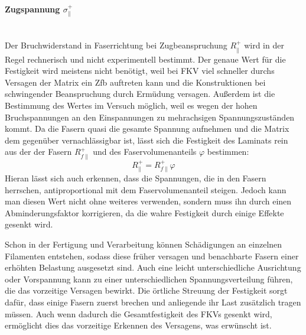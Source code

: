 \paragraph{Zugspannung $\sigma_{\parallel}^+$}~\\
Der Bruchwiderstand in Faserrichtung bei Zugbeanspruchung $R_\parallel^+$ wird in der Regel rechnerisch und nicht experimentell bestimmt. Der genaue Wert für die Festigkeit wird meistens nicht benötigt, weil bei FKV viel schneller durchs Versagen der Matrix ein Zfb auftreten kann und die Konstruktionen bei schwingender Beanspruchung durch Ermüdung versagen. Außerdem ist die Bestimmung des Wertes im Versuch möglich, weil es wegen der hohen Bruchspannungen an den Einspannungen zu mehrachsigen Spannungszuständen kommt. Da die Fasern quasi die gesamte Spannung aufnehmen und die Matrix dem gegenüber vernachlässigbar ist, lässt sich die Festigkeit des Laminats rein aus der der Fasern $R_{f \parallel}^+$ und des Faservolumenanteils $\varphi$ bestimmen:
\begin{equation}
	R_\parallel^+ = R_{f \parallel}^+\varphi
\end{equation}
Hieran lässt sich auch erkennen, dass die Spannungen, die in den Fasern herrschen, antiproportional mit dem Faservolumenanteil steigen. Jedoch kann man diesen Wert nicht ohne weiteres verwenden, sondern muss ihn durch einen Abminderungsfaktor korrigieren, da die wahre Festigkeit durch einige Effekte gesenkt wird.

\noindent Schon in der Fertigung und Verarbeitung können Schädigungen an einzelnen Filamenten entstehen, sodass diese früher versagen und benachbarte Fasern einer erhöhten Belastung ausgesetzt sind. Auch eine leicht unterschiedliche Ausrichtung oder Vorspannung kann zu einer unterschiedlichen Spannungsverteilung führen, die das vorzeitige Versagen bewirkt. Die örtliche Streuung der Festigkeit sorgt dafür, dass einige Fasern zuerst brechen und anliegende ihr Last zusätzlich tragen müssen. Auch wenn dadurch die Gesamtfestigkeit des FKVs gesenkt wird, ermöglicht dies das vorzeitige Erkennen des Versagens, was erwünscht ist.
